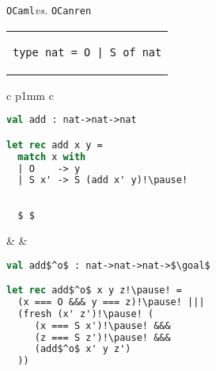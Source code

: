 \documentclass{beamer}
\let\\\tabularnewline
\let\\\tabularnewline
\newcommand{\goal}{\mathfrak G}
\newcommand{\ocanren}{\texttt{OCanren}\xspace}
\newcommand{\ocaml}{\texttt{OCaml}\xspace}
\theoremstyle{definition}
\begin{document}
\begin{frame}[fragile]{\ocaml \emph{vs.} \ocanren}
\centering
\begin{tabular}{c}
 \begin{lstlisting}
type nat = O | S of nat
 \end{lstlisting} \pause \\[5mm]
\end{tabular}
 
\begin{tabular}[b]{c p{1mm} c}
 \begin{lstlisting}[mathescape=true,language=ocaml]
val add : nat->nat->nat

let rec add x y = 
  match x with
  | O    -> y
  | S x' -> S (add x' y)!\pause!
  
  
  $ $
 \end{lstlisting} & &
 \begin{lstlisting}[mathescape=true,language=ocaml]
val add$^o$ : nat->nat->nat->$\goal$

let rec add$^o$ x y z!\pause! = 
  (x === O &&& y === z)!\pause! |||
  (fresh (x' z')!\pause! (
     (x === S x')!\pause! &&&
     (z === S z')!\pause! &&&
     (add$^o$ x' y z')    
  ))
 \end{lstlisting}
\end{tabular}

\end{frame}
\end{document}

